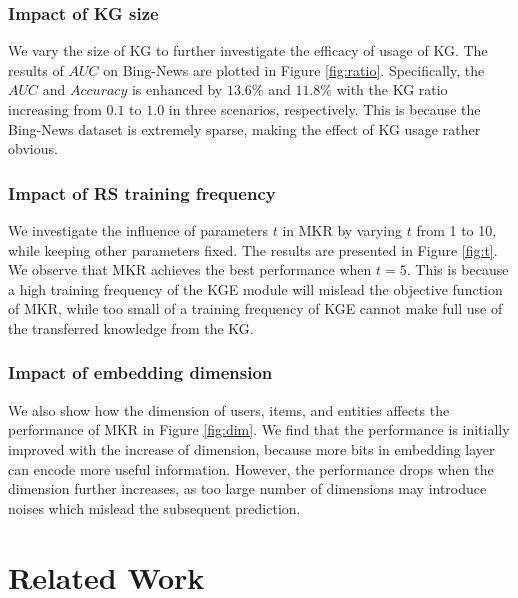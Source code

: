 \documentclass[sigconf]{acmart}
\begin{document}
    	\subsubsection{Impact of KG size}
        	We vary the size of KG to further investigate the efficacy of usage of KG.
        	The results of $AUC$ on Bing-News are plotted in Figure \ref{fig:ratio}.
        	Specifically, the $AUC$ and $Accuracy$ is enhanced by $13.6\%$ and $11.8\%$ with the KG ratio increasing from $0.1$ to $1.0$ in three scenarios, respectively.
        	This is because the Bing-News dataset is extremely sparse, making the effect of KG usage rather obvious.
        
		
		\subsubsection{Impact of RS training frequency}      
        	We investigate the influence of parameters $t$ in MKR by varying $t$ from 1 to 10, while keeping other parameters fixed.
        	The results are presented in Figure \ref{fig:t}.
        	We observe that MKR achieves the best performance when $t = 5$.
        	This is because a high training frequency of the KGE module will mislead the objective function of MKR, while too small of a training frequency of KGE cannot make full use of the transferred knowledge from the KG.
        	
        	
        \subsubsection{Impact of embedding dimension}
        	We also show how the dimension of users, items, and entities affects the performance of MKR in Figure \ref{fig:dim}.
        	We find that the performance is initially improved with the increase of dimension, because more bits in embedding layer can encode more useful information.
        	However, the performance drops when the dimension further increases, as too large number of dimensions may introduce noises which mislead the subsequent prediction.



\section{Related Work}		
\end{document}
